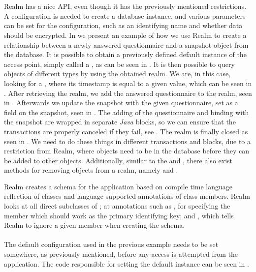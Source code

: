 \\\\
Realm has a nice API, even though it has the previously mentioned restrictions. A configuration is needed to create a database instance, and various parameters can be set for the configuration, such as an identifying name and whether data should be encrypted. In  we present an example of how we use Realm to create a relationship between a newly answered questionnaire and a snapshot object from the database. It is possible to obtain a previously defined default instance of the access point, simply called a , as can be seen in . It is then possible to query objects of different types by using the obtained realm. We are, in this case, looking for a , where its timestamp is equal to a given value, which can be seen in . After retrieving the realm, we add the answered questionnaire to the realm, seen in . Afterwards we update the snapshot with the given questionnaire, set as a field on the snapshot, seen in . The adding of the questionnaire and binding with the snapshot are wrapped in separate \emph{Java}  blocks, so we can ensure that the transactions are properly canceled if they fail, see . The realm is finally closed as seen in . We need to do these things in different transactions and  blocks, due to a restriction from Realm, where objects need to be in the database before they can be added to other objects. Additionally, similar to the  and , there also exist methods for removing objects from a realm, namely  and .
\\

\FloatBarrier

Realm creates a schema for the application based on compile time language reflection of classes and language supported annotations of class members. Realm looks at all direct subclasses of ; at annotations such as , for specifying the member which should work as the primary identifying key; and , which tells Realm to ignore a given member when creating the schema.
\\\\
The default configuration used in the previous example needs to be set somewhere, as previously mentioned, before any access is attempted from the application. The code responsible for setting the default instance can be seen in . 

